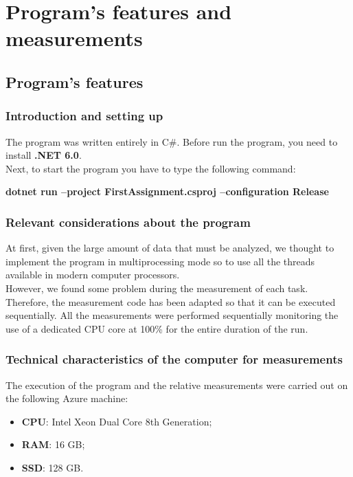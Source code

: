 \section{Program's features and measurements}

\subsection{Program's features}

\subsubsection{Introduction and setting up}
The program was written entirely in C\#.
Before run the program, you need to install \textbf{.NET 6.0}.\\
Next, to start the program you have to type the following command:\\
\centerline{\textbf{dotnet run --project FirstAssignment.csproj --configuration Release}}

\subsubsection{Relevant considerations about the program}
At first, given the large amount of data that must be analyzed, we thought to implement the program in multiprocessing mode so to use all the threads available in modern computer processors. \\
\noindent
However, we found some problem during the measurement of each task.
Therefore, the measurement code has been adapted so that it can be executed sequentially.
All the measurements were performed sequentially monitoring the use of a dedicated CPU core at 100\% for the entire duration of the run.

\subsubsection{Technical characteristics of the computer for measurements}
The execution of the program and the relative measurements were carried out on the following Azure machine:
\begin{itemize}
    \item \textbf{CPU}: Intel Xeon Dual Core 8th Generation;
    \item \textbf{RAM}: 16 GB;
    \item \textbf{SSD}: 128 GB.
\end{itemize}

